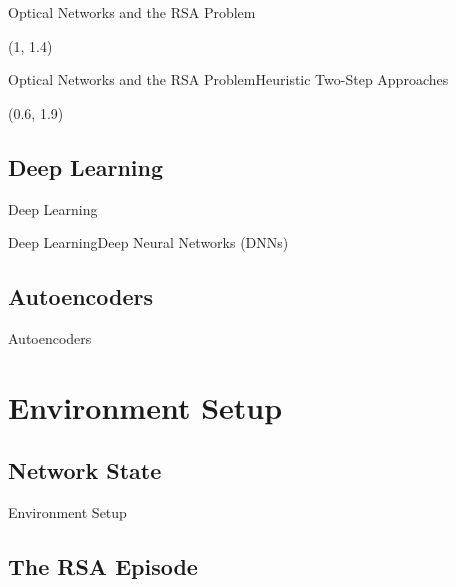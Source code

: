 \documentclass[english,aspectratio=169,dvipsnames]{beamer}
\begin{document}
\begin{frame}{Optical Networks and the RSA Problem}{}
	\begin{textblock}{5}(1, 1.4)
        
    \end{textblock}
\end{frame}


\begin{frame}{Optical Networks and the RSA Problem}{Heuristic Two-Step Approaches}
	\begin{textblock}{5}(0.6, 1.9)
        
    \end{textblock}
\end{frame}


\subsection{Deep Learning}

\begin{frame}{Deep Learning}{}
	
\end{frame}


\begin{frame}{Deep Learning}{Deep Neural Networks (DNNs)}
            
\end{frame}


\subsection{Autoencoders}

\begin{frame}{Autoencoders}{}
	
\end{frame}


\section{Environment Setup}


\subsection{Network State}

\begin{frame}{Environment Setup}{}
	
\end{frame}


\subsection{The RSA Episode}
\end{document}

